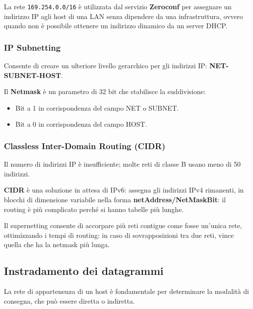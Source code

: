             La rete \verb:169.254.0.0/16: è utilizzata dal servizio \textbf{Zeroconf} per assegnare un indirizzo IP agli host di una LAN senza dipendere da una infrastruttura, ovvero quando non è possibile ottenere un indirizzo dinamico da un server DHCP.

        \subsubsection{IP Subnetting}
            Consente di creare un ulteriore livello gerarchico per gli indirizzi IP: \textbf{NET-SUBNET-HOST}.
        
            Il \textbf{Netmask} è un parametro di 32 bit che stabilisce la suddivisione:
            \begin{itemize}
                \item Bit a 1 in corrispondenza del campo NET o SUBNET.
                \item Bit a 0 in corrispondenza del campo HOST.
            \end{itemize} 
        
        \subsubsection{Classless Inter-Domain Routing (CIDR)}
            Il numero di indirizzi IP è insufficiente; molte reti di classe B usano meno di 50 indirizzi.
        
            \textbf{CIDR} è una soluzione in attesa di IPv6: assegna gli indirizzi IPv4 rimanenti, in blocchi di dimensione variabile nella forma \textbf{netAddress/NetMaskBit}: il routing è più complicato perché si hanno tabelle più lunghe.
        
            Il supernetting consente di accorpare più reti contigue come fosse un'unica rete, ottimizzando i tempi di routing: in caso di sovrapposizioni tra due reti, vince quella che ha la netmask più lunga.

    \subsection{Instradamento dei datagrammi}
        La rete di appartenenza di un host è fondamentale per determinare la modalità di consegna, che può essere diretta o indiretta.
    
